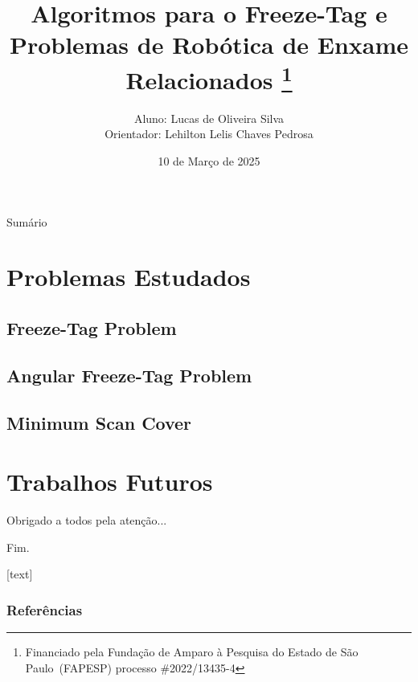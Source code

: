 \documentclass[xcolor=table]{beamer}
\title{
  Algoritmos para o Freeze-Tag e Problemas de Robótica de Enxame Relacionados%
  \texorpdfstring{\footnote{Financiado pela Fundação de Amparo à Pesquisa do
  Estado de São Paulo~(FAPESP) processo \mbox{\#2022/13435-4}}}{}
}
\author{
  Aluno: Lucas de Oliveira Silva\texorpdfstring{\\}{}
  Orientador: Lehilton Lelis Chaves Pedrosa
}
\institute{Instituto de Computação, Unicamp}
\date{10 de Março de 2025}
\begin{document}
\begin{frame}[plain]
  \titlepage
\end{frame}

\setcounter{tocdepth}{1}
\begin{frame}{Sumário}
  \tableofcontents
\end{frame}


\section{Problemas Estudados}

\subsection{Freeze-Tag Problem}


\subsection{Angular Freeze-Tag Problem}


\subsection{Minimum Scan Cover}


\section{Trabalhos Futuros}


\begin{frame}
  \large{\centerline{Obrigado a todos pela atenção...}}
  \pause
  \Huge{\centerline{Fim.}}
\end{frame}


\appendix

[text]
\begin{frame}[allowframebreaks]
  \frametitle{Referências}
  {
    \tiny
    
    
  }
\end{frame}

\end{document}
